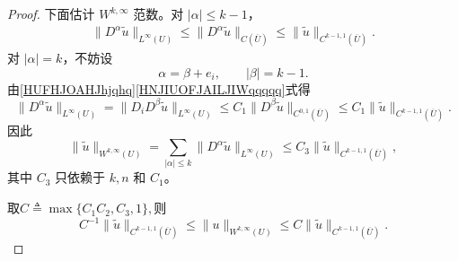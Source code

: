 \documentclass[../../main.tex]{subfiles}
\begin{document}
\begin{proof}
下面估计 \(W^{k,\infty}\) 范数。对 \(|\alpha|\leqslant k-1\)，
\begin{align}
\|D^\alpha\widetilde u\|_{L^\infty(U)}
\leqslant
\|D^\alpha\widetilde u\|_{C(\overline U)}
\leqslant
\|\widetilde u\|_{C^{k-1,1}(\overline U)}.\label{HNJIUOFJAILJIWqqqqq}
\end{align}
对 \(|\alpha|=k\)，不妨设
\[
\alpha=\beta+e_i,
\qquad
|\beta|=k-1.
\]
由\eqref{HUFHJOAHJhjqhq}\eqref{HNJIUOFJAILJIWqqqqq}式得
\[
\|D^\alpha\widetilde u\|_{L^\infty(U)}
=
\|D_iD^\beta\widetilde u\|_{L^\infty(U)}
\leqslant
C_1
\|D^\beta\widetilde u\|_{C^{0,1}(\overline U)}
\leqslant
C_1
\|\widetilde u\|_{C^{k-1,1}(\overline U)}.
\]
因此
\[
\|\widetilde u\|_{W^{k,\infty}(U)}
=
\sum_{|\alpha|\leqslant k}
\|D^\alpha\widetilde u\|_{L^\infty(U)}
\leqslant
C_3
\|\widetilde u\|_{C^{k-1,1}(\overline U)},
\]
其中 \(C_3\) 只依赖于 \(k,n\) 和 \(C_1\)。

取$C\triangleq\max\{C_1C_2,C_3,1\},$则
\[
C^{-1}\|\widetilde u\|_{C^{k-1,1}(\overline U)}
\leqslant
\|u\|_{W^{k,\infty}(U)}
\leqslant
C\|\widetilde u\|_{C^{k-1,1}(\overline U)}.
\]
\end{proof}
\end{document}
